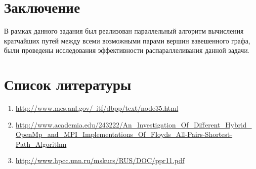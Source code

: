 \documentclass[a4paper,12pt]{report}
\begin{document}
\section*{Заключение}
	\par В рамках данного задания был реализован параллельный алгоритм вычисления кратчайших путей между всеми возможными парами вершин взвешенного графа, были проведены исследования эффективности распараллеливания данной задачи.
	
\section*{Список литературы}
\begin{enumerate}
\item
\href{http://www.mcs.anl.gov/~itf/dbpp/text/node35.html}{http://www.mcs.anl.gov/~itf/dbpp/text/node35.html}\\
\item
\href{http://www.academia.edu/243222/An\_Investigation\_Of\_Different\_Hybrid\_OpenMp\_and\_MPI\_Implementations\_Of\_Floyds\_All-Pairs-Shortest-Path\_Algorithm}{http://www.academia.edu/243222/An\_Investigation\_Of\_Different\_Hybrid\_OpenMp\_and\_MPI\_Implementations\_Of\_Floyds\_All-Pairs-Shortest-Path\_Algorithm}\\
\item
\href{http://www.hpcc.unn.ru/mskurs/RUS/DOC/ppr11.pdf}{http://www.hpcc.unn.ru/mskurs/RUS/DOC/ppr11.pdf}\\
\end{enumerate}
\end{document}
